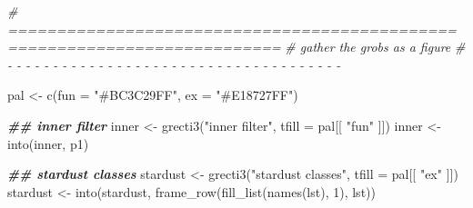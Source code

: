 \documentclass[
]{article}
\newenvironment{Shaded}{\begin{snugshade}}{\end{snugshade}}
\newcommand{\AttributeTok}[1]{\textcolor[rgb]{0.77,0.63,0.00}{#1}}
\newcommand{\CommentTok}[1]{\textcolor[rgb]{0.56,0.35,0.01}{\textit{#1}}}
\newcommand{\DecValTok}[1]{\textcolor[rgb]{0.00,0.00,0.81}{#1}}
\newcommand{\DocumentationTok}[1]{\textcolor[rgb]{0.56,0.35,0.01}{\textbf{\textit{#1}}}}
\newcommand{\FunctionTok}[1]{\textcolor[rgb]{0.00,0.00,0.00}{#1}}
\newcommand{\NormalTok}[1]{#1}
\newcommand{\OtherTok}[1]{\textcolor[rgb]{0.56,0.35,0.01}{#1}}
\newcommand{\StringTok}[1]{\textcolor[rgb]{0.31,0.60,0.02}{#1}}
\begin{document}
\begin{Shaded}
\begin{Highlighting}[]
\CommentTok{\# ==========================================================================}
\CommentTok{\# gather the grobs as a figure}
\CommentTok{\# {-} {-} {-} {-} {-} {-} {-} {-} {-} {-} {-} {-} {-} {-} {-} {-} {-} {-} {-} {-} {-} {-} {-} {-} {-} {-} {-} {-} {-} {-} {-} {-} {-} {-} {-} {-} {-}}

\NormalTok{pal }\OtherTok{\textless{}{-}} \FunctionTok{c}\NormalTok{(}\AttributeTok{fun =} \StringTok{"\#BC3C29FF"}\NormalTok{, }\AttributeTok{ex =} \StringTok{"\#E18727FF"}\NormalTok{)}

\DocumentationTok{\#\# inner filter}
\NormalTok{inner }\OtherTok{\textless{}{-}} \FunctionTok{grecti3}\NormalTok{(}\StringTok{"inner filter"}\NormalTok{, }\AttributeTok{tfill =}\NormalTok{ pal[[ }\StringTok{"fun"}\NormalTok{ ]])}
\NormalTok{inner }\OtherTok{\textless{}{-}} \FunctionTok{into}\NormalTok{(inner, p1)}

\DocumentationTok{\#\# stardust classes}
\NormalTok{stardust }\OtherTok{\textless{}{-}} \FunctionTok{grecti3}\NormalTok{(}\StringTok{"stardust classes"}\NormalTok{, }\AttributeTok{tfill =}\NormalTok{ pal[[ }\StringTok{"ex"}\NormalTok{ ]])}
\NormalTok{stardust }\OtherTok{\textless{}{-}} \FunctionTok{into}\NormalTok{(stardust, }\FunctionTok{frame\_row}\NormalTok{(}\FunctionTok{fill\_list}\NormalTok{(}\FunctionTok{names}\NormalTok{(lst), }\DecValTok{1}\NormalTok{), lst))}


\end{Highlighting}
\end{Shaded}
\end{document}
